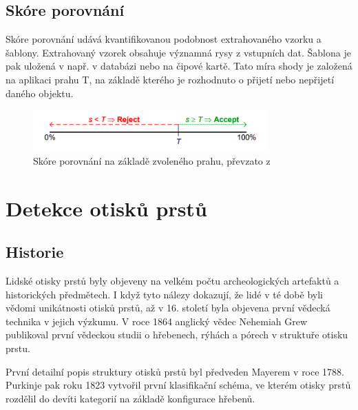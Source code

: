 \section{Skóre porovnání}
Skóre porovnání udává kvantifikovanou podobnost extrahovaného vzorku a šablony. Extrahovaný vzorek obsahuje významná rysy z vstupních dat. Šablona je pak uložená v např. v databázi nebo na čipové kartě. Tato míra shody je založená na aplikaci prahu T, na základě kterého je rozhodnuto o přijetí nebo nepřijetí daného objektu.

\begin{figure}[htbp]
    \centering
    \includegraphics[width=340px]{obrazky-figures/mira.png}
    \caption{Skóre porovnání na základě zvoleného prahu, převzato z \cite{Drahansky}}
\end{figure}

\chapter{Detekce otisků prstů}
\section{Historie}
Lidské otisky prstů byly objeveny na velkém počtu archeologických artefaktů a historických předmětech. I když tyto nálezy dokazují, že lidé v té době byli vědomi unikátnosti otisků prstů, až v 16. století byla objevena první vědecká technika v jejich výzkumu. V roce 1864 anglický vědec Nehemiah Grew publikoval první vědeckou studii o hřebenech, rýhách a pórech v struktuře otisku prstu.

První detailní popis struktury otisků prstů byl předveden Mayerem v roce 1788. Purkinje pak roku 1823 vytvořil první klasifikační schéma, ve kterém otisky prstů rozdělil do devíti kategorií na základě konfigurace hřebenů.\cite{Maltoni2009}


